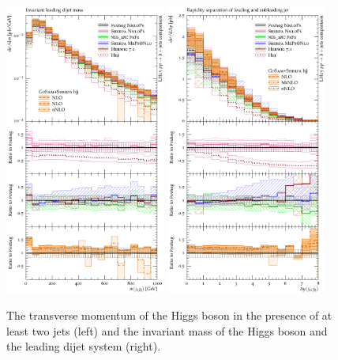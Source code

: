\begin{figure}[t!]
  \centering
  \includegraphics[width=0.47\textwidth]{figures/hjetscomp_dijet_mass.pdf}
  \quad
  \includegraphics[width=0.47\textwidth]{figures/hjetscomp_deltay_jj.pdf}
  \caption{
    The transverse momentum of the Higgs boson in the 
    presence of at least two jets (left) and the invariant mass of the 
    Higgs boson and the leading dijet system (right).
    \label{fig:higgscomp:results:2obs:mjj_dyjj}
  }
\end{figure}

